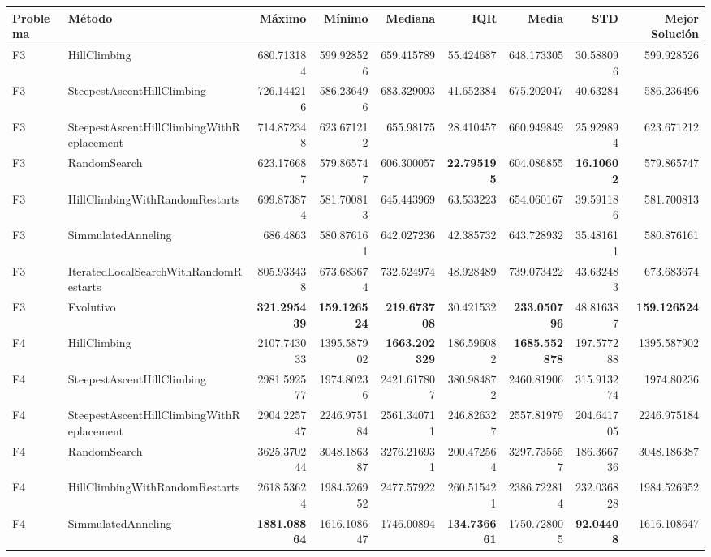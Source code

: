 \begin{tabular}{llrrrrrrr}
\toprule
Problema & Método & Máximo & Mínimo & Mediana & IQR & Media & STD & Mejor Solución \\ 
\midrule
F3 & HillClimbing & 680.713184 & 599.928526 & 659.415789 & 55.424687 & 648.173305 & 30.588096 & 599.928526 \\ 
F3 & SteepestAscentHillClimbing & 726.144216 & 586.236496 & 683.329093 & 41.652384 & 675.202047 & 40.63284 & 586.236496 \\ 
F3 & SteepestAscentHillClimbingWithReplacement & 714.872348 & 623.671212 & 655.98175 & 28.410457 & 660.949849 & 25.929894 & 623.671212 \\ 
F3 & RandomSearch & 623.176687 & 579.865747 & 606.300057 & \textbf{22.795195} & 604.086855 & \textbf{16.10602} & 579.865747 \\ 
F3 & HillClimbingWithRandomRestarts & 699.873874 & 581.700813 & 645.443969 & 63.533223 & 654.060167 & 39.591186 & 581.700813 \\ 
F3 & SimmulatedAnneling & 686.4863 & 580.876161 & 642.027236 & 42.385732 & 643.728932 & 35.481611 & 580.876161 \\ 
F3 & IteratedLocalSearchWithRandomRestarts & 805.933438 & 673.683674 & 732.524974 & 48.928489 & 739.073422 & 43.632483 & 673.683674 \\ 
F3 & Evolutivo & \textbf{321.295439} & \textbf{159.126524} & \textbf{219.673708} & 30.421532 & \textbf{233.050796} & 48.816387 & \textbf{159.126524} \\ 
\midrule
F4 & HillClimbing & 2107.743033 & 1395.587902 & \textbf{1663.202329} & 186.596082 & \textbf{1685.552878} & 197.577288 & 1395.587902 \\ 
F4 & SteepestAscentHillClimbing & 2981.592577 & 1974.80236 & 2421.617807 & 380.984872 & 2460.81906 & 315.913274 & 1974.80236 \\ 
F4 & SteepestAscentHillClimbingWithReplacement & 2904.225747 & 2246.975184 & 2561.340711 & 246.826327 & 2557.81979 & 204.641705 & 2246.975184 \\ 
F4 & RandomSearch & 3625.370244 & 3048.186387 & 3276.216931 & 200.472564 & 3297.735557 & 186.366736 & 3048.186387 \\ 
F4 & HillClimbingWithRandomRestarts & 2618.53624 & 1984.526952 & 2477.57922 & 260.515421 & 2386.722814 & 232.036828 & 1984.526952 \\ 
F4 & SimmulatedAnneling & \textbf{1881.08864} & 1616.108647 & 1746.00894 & \textbf{134.736661} & 1750.728005 & \textbf{92.04408} & 1616.108647 \\ 

\end{tabular}
